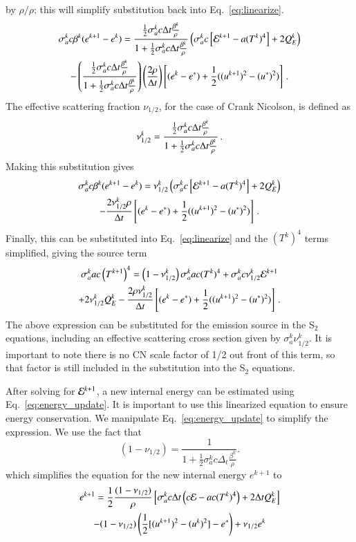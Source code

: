 by $\rho/\rho$; this will simplify substitution back into
Eq.~\eqref{eq:linearize}.
\begin{multline}
    \sigma_a^k c \beta^k (e^{k+1} - e^k) = \frac{\frac{1}{2}\sigma_a^k c \Delta t
    \frac{\beta^k}{\rho}}{1+\frac{1}{2}\sigma_a^k c \Delta t \frac{\beta^k}{\rho}}
    \left(\sigma_a^k c\left[\mathcal{E}^{k+1} - a (T^k)^4\right] + 2Q_E^k\right)\\
    - \left(\frac{\frac{1}{2}\sigma_a^k c\Delta t \frac{\beta^k}{\rho}}
    {1 +\frac{1}{2}\sigma_a^k c \Delta t \frac{\beta^k}{\rho}}\right)
    \left(\frac{2\rho}{\Delta t}\right)\left[(e^k - e^*)
    + \frac{1}{2}((u^{k+1})^2 - (u^*)^2)\right] \, .
 \end{multline}
The effective scattering fraction $\nu_{1/2}$, for the case of Crank Nicolson, is
defined as
\begin{equation}
    \nu_{1/2}^k = \frac{\frac{1}{2}\sigma_a^k c\Delta t \frac{\beta^k}{\rho}}
    {1 + \frac{1}{2}\sigma_a^k c\Delta t \frac{\beta^k}{\rho}  } \, .
\end{equation}
Making this substitution gives
\begin{multline*}
    \sigma_a^k c \beta^k(e^{k+1} - e^k) = \nu_{1/2}^k \left(\sigma_a^k c
    \left[\mathcal{E}^{k+1} - a (T^k)^4\right] + 2Q_E^k\right)\\
    -\frac{2\nu_{1/2}^k\rho}{\Delta t} \left[(e^k - e^*)
    + \frac{1}{2}((u^{k+1})^2 - (u^*)^2)\right] \, .
\end{multline*}
Finally, this can be substituted into Eq.~\eqref{eq:linearize} and the $(T^k)^4$
terms simplified, giving the source term
\begin{multline}
   \sigma_a^k a c\left(T^{k+1}\right)^4 = \left(1 - \nu_{1/2}^k\right)
   \sigma_a^k a c (T^k)^4 + \sigma_a^k c \nu_{1/2}^k \mathcal{E}^{k+1}\\
   +2\nu_{1/2}^k Q_E^k - \frac{2\rho\nu_{1/2}^k}{\Delta t}
   \left[(e^k - e^*) + \frac{1}{2}((u^{k+1})^2 - (u^*)^2)\right] \, .
\end{multline}
The above expression can be substituted for the emission source in the S$_2$
equations, including an effective scattering cross section given by $\sigma_a^k
\nu_{1/2}^k$. It is important to note there is no CN scale factor of 1/2 out front of
this term, so that factor is still included in the substitution into the S$_2$
equations.

After solving for $\mathcal{E}^{k+1}$, a new internal energy can be estimated
using Eq.~\eqref{eq:energy_update}. It is important to use this linearized
equation to ensure energy conservation.  We manipulate Eq.~\eqref{eq:energy_update}
to simplify the expression.  We use the fact
that
\begin{equation}
   (1 - \nu_{1/2}) = \frac{1}{1+\frac{1}{2}\sigma_a^kc\Delta_t\frac{\beta^k}{\rho}}.
\end{equation}
which simplifies the equation for the new internal energy $e^{k+1}$ to
\begin{multline}
    e^{k+1} = \frac{1}{2}\frac{(1-\nu_{1/2})}{\rho}\left[\sigma_a^k c\Delta t \left(c\mathcal{E}
    - ac(T^k)^4\right) + 2\Delta t Q_E^k \right] \\ - (1 -
    \nu_{1/2})\left(\frac{1}{2}[(u^{k+1})^2 - (u^{k})^2]-e^*\right) + \nu_{1/2}e^k
\end{multline}

